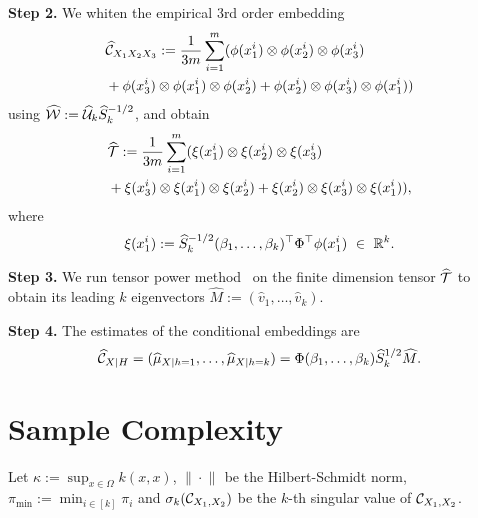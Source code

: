 \documentclass{article}
\newcommand{\Note}[1]{{\color{red}{\bf\sf [note: #1]}}}
\begin{document}
{\bf Step 2.} We whiten the empirical 3rd order embedding
\begin{align*}
  &\widehat {\mathcal{C}}_{X_1 X_2 X_3}:= \frac{1}{3m}\sum_{i=1}^{m} (\phi(x_1^i) \otimes \phi(x_2^i) \otimes \phi(x_3^i) \\
  &+ \phi(x_3^i) \otimes \phi(x_1^i) \otimes \phi(x_2^i) + \phi(x_2^i) \otimes \phi(x_3^i) \otimes \phi(x_1^i))
\end{align*}
using $\widehat {\mathcal{W}}:= \widehat {\mathcal{U}}_k \widehat S_k^{-1/2}$, and obtain
\begin{align*}
  &\widehat {{\mathcal{T}}} := \frac{1}{3m}\sum_{i=1}^m (\xi(x_1^i) \otimes \xi(x_2^i) \otimes \xi(x_3^i) \\
  &+ \xi(x_3^i) \otimes \xi(x_1^i) \otimes \xi(x_2^i) + \xi(x_2^i) \otimes \xi(x_3^i) \otimes \xi(x_1^i)),
\end{align*}
where
$$
	\xi(x_1^i) := \widehat S_k^{-1/2} (\beta_1,\ldots,\beta_k)^\top \Phi^\top \phi(x_1^i)~ \in~\mathbb{R}^k.
$$

{\bf Step 3.} We run tensor power method~\cite{AnandkumarEtal:community12} on the finite dimension tensor $\widehat {{\mathcal{T}}}$ to obtain its leading $k$ eigenvectors $\widehat M:=(\widehat v_1,\ldots,\widehat v_k)$.

{\bf Step 4.} The estimates of the conditional embeddings are
\begin{align*}
  \widehat {\mathcal{C}}_{X|H} = (\widehat \mu_{X|h=1},\ldots, \widehat \mu_{X|h=k}) = \Phi (\beta_1,\ldots,\beta_k) \widehat  S_k^{1/2} \widehat M.
\end{align*}

\section{Sample Complexity}

Let $\kappa:=\sup_{x \in \Omega} k(x,x)$,   $\| \cdot\|_{}$ be the Hilbert-Schmidt norm, $\pi_{\min}:=\min_{i\in [k]} \pi_i$ and $\sigma_k(\mathcal{C}_{X_1, X_2})$ be the $k$-th singular value of $\mathcal{C}_{X_1, X_2}$.

\Note{can you provide a simplified version of the following theorem. and add some intuitive interpretation after that?}
\end{document}
